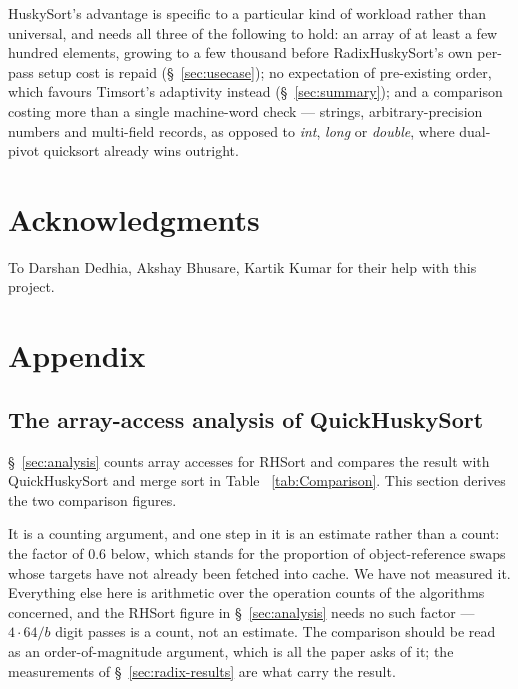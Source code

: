 \documentclass[twoside,leqno,twocolumn]{article}
\begin{document}
HuskySort's advantage is specific to a particular kind of workload rather than universal, and needs
all three of the following to hold: an array of at least a few hundred elements, growing to a few
thousand before RadixHuskySort's own per-pass setup cost is repaid (\S~\ref{sec:usecase});
no expectation of pre-existing order, which favours Timsort's adaptivity instead (\S~\ref{sec:summary});
and a comparison costing more than a single machine-word check --- strings, arbitrary-precision numbers
and multi-field records, as opposed to \textit{int}, \textit{long} or \textit{double},
where dual-pivot quicksort already wins outright.

\section*{Acknowledgments}
To Darshan Dedhia, Akshay Bhusare, Kartik Kumar for their help with this project.







\appendix
\section{Appendix}
\subsection{The array-access analysis of QuickHuskySort}
\label{sec:qhs-analysis}

\S~\ref{sec:analysis} counts array accesses for RHSort and compares the result with QuickHuskySort and
merge sort in Table ~\ref{tab:Comparison}. This section derives the two comparison figures.

It is a counting argument, and one step in it is an estimate rather than a count: the factor of 0.6
below, which stands for the proportion of object-reference swaps whose targets have not already been
fetched into cache. We have not measured it. Everything else here is arithmetic over the operation
counts of the algorithms concerned, and the RHSort figure in \S~\ref{sec:analysis} needs no such
factor --- $4 \cdot 64/b$ digit passes is a count, not an estimate. The comparison should be read as an
order-of-magnitude argument, which is all the paper asks of it; the measurements of
\S~\ref{sec:radix-results} are what carry the result.
\end{document}
